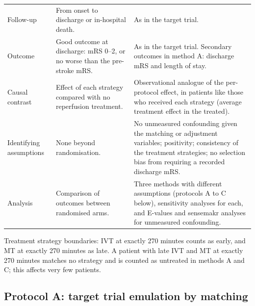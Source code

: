 {\begin{longtable}[]{@{}p{}p{}p{}@{}}
\addlinespace
Follow-up & From onset to discharge or in-hospital death. & As in the target trial. \\
\addlinespace
Outcome & Good outcome at discharge: mRS 0--2, or no worse than the pre-stroke mRS. & As in the target trial. Secondary outcomes in method A: discharge mRS and length of stay. \\
\addlinespace
Causal contrast & Effect of each strategy compared with no reperfusion treatment. & Observational analogue of the per-protocol effect, in patients like those who received each strategy (average treatment effect in the treated). \\
\addlinespace
Identifying assumptions & None beyond randomisation. & No unmeasured confounding given the matching or adjustment variables; positivity; consistency of the treatment strategies; no selection bias from requiring a recorded discharge mRS. \\
\addlinespace
Analysis & Comparison of outcomes between randomised arms. & Three methods with different assumptions (protocols A to C below), sensitivity analyses for each, and E-values and sensemakr analyses for unmeasured confounding. \\
\end{longtable}
}

Treatment strategy boundaries: IVT at exactly 270 minutes counts as early, and MT at exactly 270 minutes as late. A patient with late IVT and MT at exactly 270 minutes matches no strategy and is counted as untreated in methods A and C; this affects very few patients.

\subsection{Protocol A: target trial emulation by matching}

